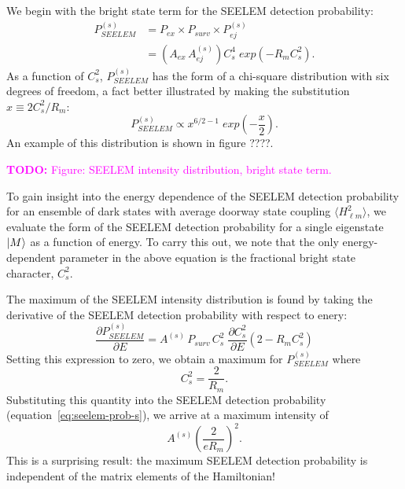 \documentclass[12pt]{mitthesis}
\newcommand{\TODO} [1]{\textcolor{magenta}{\textbf{TODO:} #1}}
\begin{document}
We begin with the bright state term for the SEELEM detection probability:
\begin{equation}
  \label{eq:seelem-prob-s}
  \begin{split}
    P_{SEELEM}^{(s)} &= P_{ex} \times P_{surv} \times P_{ej}^{(s)}\\
    &= \left( A_{ex} \, A_{ej}^{(s)} \right) C_s^4 \; exp \left( -R_m
      C_s^2 \right).
  \end{split}
\end{equation}
As a function of $C_s^2$, $P_{SEELEM}^{(s)}$ has the form of a
chi-square distribution with six degrees of freedom, a fact
better illustrated by making the substitution $x \equiv 2 C_s^2 /
R_m$:
\begin{equation}
  \label{eq:seelem-prob-chisq}
  P_{SEELEM}^{(s)} \propto x^{6/2 - 1} \; exp \left( - \frac{x}{2} \right).
\end{equation}
An example of this distribution is shown in figure ????.

\TODO{Figure: SEELEM intensity distribution, bright state term.}

To gain insight into the energy dependence of the SEELEM detection
probability for an ensemble of dark states with average doorway state
coupling $\langle H_{\ell m}^2 \rangle$, we evaluate the form of the
SEELEM detection probability for a single eigenstate $\mathinner{|{M}\rangle}$ as a
function of energy.  To carry this out, we note that the only
energy-dependent parameter in the above equation is the fractional
bright state character, $C_s^2$.

The maximum of the SEELEM intensity distribution is found by taking
the derivative of the SEELEM detection probability with respect to
enery:
\begin{equation}
    \frac{\partial P_{SEELEM}^{(s)}}{\partial E} = 
       A^{(s)} \, P_{surv} \, C_s^2 \; \frac{\partial C_s^2}{\partial E} 
       \left( 2 - R_m C_s^2 \right)
\end{equation}
Setting this expression to zero, we obtain a maximum for
$P_{SEELEM}^{(s)}$ where
\begin{equation}
  C_s^2 = \frac{2}{R_m}.
\end{equation}
Substituting this quantity into the SEELEM detection probability
(equation~\ref{eq:seelem-prob-s}), we arrive at a maximum intensity of
\begin{equation}\label{eq:seelem-max-s}
  A^{(s)} \left( \frac{2}{e R_m} \right)^2.
\end{equation}
This is a surprising result: the maximum SEELEM detection probability
is independent of the matrix elements of the Hamiltonian! 
\end{document}
